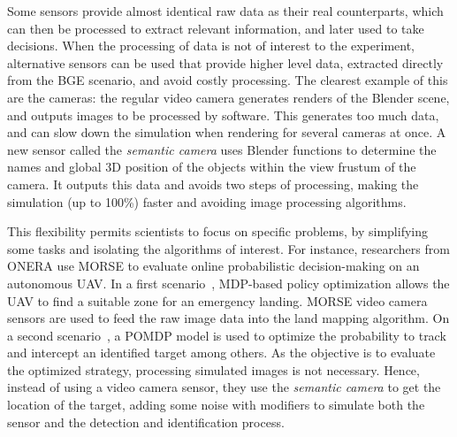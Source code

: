 \documentclass{llncs}
\newcommand{\serge}[1]{\nb{Serge}{blue}{#1}}
\newcommand{\gilberto}[1]{\nb{Gilberto}{red}{#1}}
\begin{document}
Some sensors provide almost identical raw data as their real counterparts,
which can then be processed to extract relevant information,
and later used to take decisions. When the processing of data is not of
interest to the experiment, alternative sensors can be used that provide
higher level data, extracted directly from the BGE scenario, and avoid costly
processing.
The clearest example of this are the cameras: the regular video camera
generates renders of the Blender scene, and outputs images to be processed by
software. This generates too much data, and can slow down the simulation when
rendering for several cameras at once. A new sensor called the \emph{semantic
camera} uses Blender functions to determine the names and global 3D position of
the objects within the view frustum of the camera. It outputs this data and
avoids two steps of processing, making the simulation (up to 100\%) faster and
avoiding image processing algorithms.

This flexibility permits scientists to focus on specific problems, by 
simplifying some tasks and isolating the algorithms of interest.
For instance, researchers from ONERA use MORSE to evaluate online probabilistic
decision-making on an autonomous UAV. In a first scenario~\cite{teichteil2011},
MDP-based policy optimization allows the UAV to find a suitable zone for an
emergency landing. MORSE video camera sensors are used to feed the raw image data
into the land mapping algorithm.
On a second scenario~\cite{carvalho2012}, a POMDP model is used to optimize the
probability to track and intercept an identified target among others. As the
objective is to evaluate the optimized strategy, processing
simulated images is not necessary. Hence, instead of using a video camera
sensor, they use the \emph{semantic camera} to get the location of the target,
adding some noise with modifiers to simulate both the sensor and the detection
and identification process.

%

\end{document}
